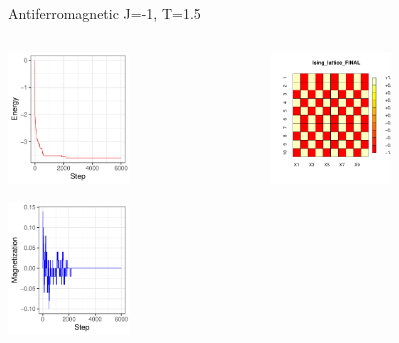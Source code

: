 \documentclass{beamer}
\begin{document}
\begin{frame}{Antiferromagnetic J=-1, T=1.5}
\begin{columns}
\begin{column}{0.5\textwidth}
    \begin{center}
     \includegraphics[width=0.5\textwidth]{Pic/J-1_60_2500_T=1.5_ENERGY.pdf}
     \end{center}
         \begin{center}
     \includegraphics[width=0.5\textwidth]{Pic/J-1_60_2500_T=1.5_Magnetization.pdf}
     \end{center}
\end{column}
\begin{column}{0.5\textwidth}
    \begin{center}
     \includegraphics[width=0.5\textwidth]{Pic/J-1_60_2500_T=1.5_FINAL.pdf}

\end{center}
\end{column}
\end{columns}
\end{frame}
\end{document}
